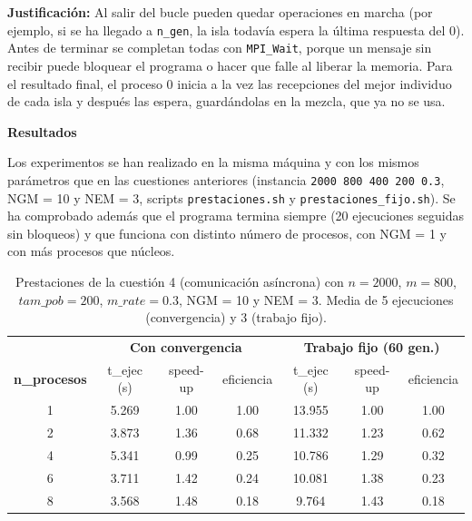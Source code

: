 \documentclass[12pt]{article}
\begin{document}
\begin{enumerate}
\textbf{Justificación:} Al salir del bucle pueden quedar operaciones en marcha (por ejemplo, si se ha llegado a \texttt{n\_gen}, la isla todavía espera la última respuesta del 0). Antes de terminar se completan todas con \texttt{MPI\_Wait}, porque un mensaje sin recibir puede bloquear el programa o hacer que falle al liberar la memoria. Para el resultado final, el proceso 0 inicia a la vez las recepciones del mejor individuo de cada isla y después las espera, guardándolas en la mezcla, que ya no se usa.

\vspace{0.5cm}

\medskip
\noindent\textbf{Resultados}\par
\smallskip

Los experimentos se han realizado en la misma máquina y con los mismos parámetros que en las cuestiones anteriores (instancia \texttt{2000 800 400 200 0.3}, NGM = 10 y NEM = 3, scripts \texttt{prestaciones.sh} y \texttt{prestaciones\_fijo.sh}). Se ha comprobado además que el programa termina siempre (20 ejecuciones seguidas sin bloqueos) y que funciona con distinto número de procesos, con NGM = 1 y con más procesos que núcleos.

\begin{table}[htbp]
\centering
\begin{tabular}{c|ccc|ccc}
\toprule
& \multicolumn{3}{c|}{\textbf{Con convergencia}} & \multicolumn{3}{c}{\textbf{Trabajo fijo (60 gen.)}} \\
\textbf{n\_procesos} & t\_ejec (s) & speed-up & eficiencia & t\_ejec (s) & speed-up & eficiencia \\
\midrule
1 & 5.269 & 1.00 & 1.00 & 13.955 & 1.00 & 1.00 \\
2 & 3.873 & 1.36 & 0.68 & 11.332 & 1.23 & 0.62 \\
4 & 5.341 & 0.99 & 0.25 & 10.786 & 1.29 & 0.32 \\
6 & 3.711 & 1.42 & 0.24 & 10.081 & 1.38 & 0.23 \\
8 & 3.568 & 1.48 & 0.18 & 9.764 & 1.43 & 0.18 \\
\bottomrule
\end{tabular}
\caption{Prestaciones de la cuestión 4 (comunicación asíncrona) con $n=2000$, $m=800$, $tam\_pob=200$, $m\_rate=0.3$, NGM = 10 y NEM = 3. Media de 5 ejecuciones (convergencia) y 3 (trabajo fijo).}
\label{tab:c4_prestaciones}
\end{table}


\end{enumerate}
\end{document}
